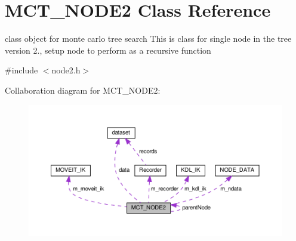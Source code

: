 \hypertarget{classMCT__NODE2}{}\section{M\+C\+T\+\_\+\+N\+O\+D\+E2 Class Reference}
\label{classMCT__NODE2}


class object for monte carlo tree search This is class for single node in the tree version 2., setup node to perform as a recursive function  




{\ttfamily \#include $<$node2.\+h$>$}



Collaboration diagram for M\+C\+T\+\_\+\+N\+O\+D\+E2\+:
\nopagebreak
\begin{figure}[H]
\begin{center}
\leavevmode
\includegraphics[width=350pt]{classMCT__NODE2__coll__graph}
\end{center}
\end{figure}
